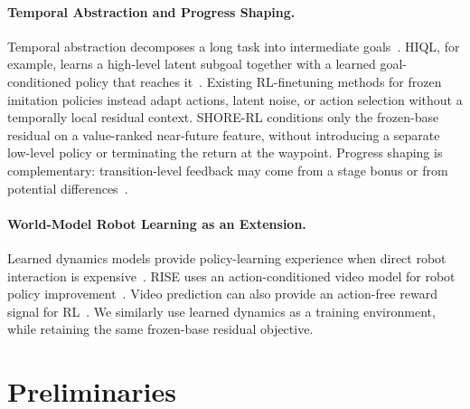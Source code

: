 \documentclass[letterpaper]{article} %
\begin{document}
\paragraph{Temporal Abstraction and Progress Shaping.}
Temporal abstraction decomposes a long task into intermediate
goals~\cite{nachum2018hiro,fang2022ptp,shi2023skimo,zheng2024prise,sutton1999between,kulkarni2016hierarchical,dietterich2000maxq}. HIQL, for
example, learns a high-level latent subgoal together with a learned goal-conditioned
policy that reaches it~\cite{park2023hiql}. Existing RL-finetuning methods for
frozen imitation policies instead adapt actions, latent noise, or action
selection without a temporally local residual context. SHORE-RL conditions
only the frozen-base residual on a value-ranked near-future feature, without
introducing a separate low-level policy or terminating the return at the
waypoint. Progress shaping is complementary:
transition-level feedback may come from a stage bonus or from potential
differences~\cite{ng1999policy,devlin2012dynamic,wiewiora2003principled}.

\paragraph{World-Model Robot Learning as an Extension.}
Learned dynamics models provide policy-learning experience when direct robot
interaction is expensive~\cite{hafner2020dreamer,janner2019mbpo,hansen2024tdmpc2,mazzaglia2023choreographer,wu2023daydreamer}.
RISE uses an action-conditioned video model for robot policy
improvement~\cite{yang2026rise}. Video prediction can also provide an
action-free reward signal for RL~\cite{escontrela2023viper}. We similarly use learned
dynamics as a training environment, while retaining the same frozen-base
residual objective.

\section{Preliminaries}
\end{document}
